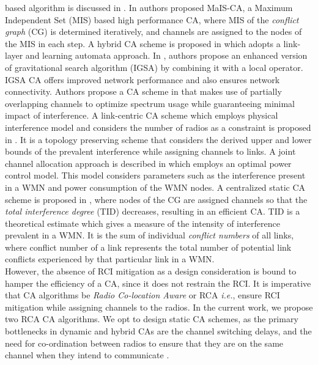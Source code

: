 \documentclass[conference]{IEEEtran}
\begin{document}
based algorithm is discussed in \cite{17Xutao}. In \cite{24Aizaz} authors proposed MaIS-CA, a Maximum Independent Set (MIS) based high performance CA, where MIS of the \textit{conflict graph} (CG) is determined iteratively, and channels are assigned to the nodes of the MIS in each step. A hybrid CA scheme is proposed in \cite{LLLA} which adopts a link-layer and learning automata approach. In \cite{Gravity}, authors propose an enhanced version of gravitational search algorithm (IGSA) by combining it with a local operator. IGSA CA offers improved network performance and also ensures network connectivity. Authors propose a CA scheme in \cite{Part} that makes use of partially overlapping channels to optimize spectrum usage while guaranteeing minimal impact of interference. A link-centric CA scheme which employs physical interference model and considers the number of radios as a constraint is proposed in \cite{Linkc}. It is a topology preserving scheme that considers the  derived upper and lower bounds of the 
prevalent interference while assigning channels to links. A joint channel allocation approach is described in \cite{Joint} which employs an optimal power control model. This model considers parameters such as the interference present in a WMN and power consumption of the WMN nodes. A centralized static CA scheme is proposed in \cite{23Cheng}, where nodes of the CG are assigned channels so that the \textit{total interference degree} (TID) decreases, resulting in an efficient CA. TID is a theoretical estimate which gives a measure of the intensity of interference prevalent in a WMN. It is the sum of individual \textit{conflict numbers} of all links, where conflict number of a link represents the total number of potential link conflicts experienced by that particular link in a WMN.\\
However, the absence of RCI mitigation as a design consideration is bound to hamper the efficiency of a CA, since it does not restrain the RCI. It is imperative that CA algorithms be \textit{Radio Co-location Aware} or RCA \emph{i.e.}, ensure RCI mitigation while assigning channels to the radios. In the current work, we propose two RCA CA algorithms. We opt to design static CA schemes, as the primary bottlenecks in dynamic and hybrid CAs are the channel switching delays, and the need for co-ordination between radios to ensure that they are on the same channel when they intend to communicate \cite{8Raniwala}.
\end{document}
